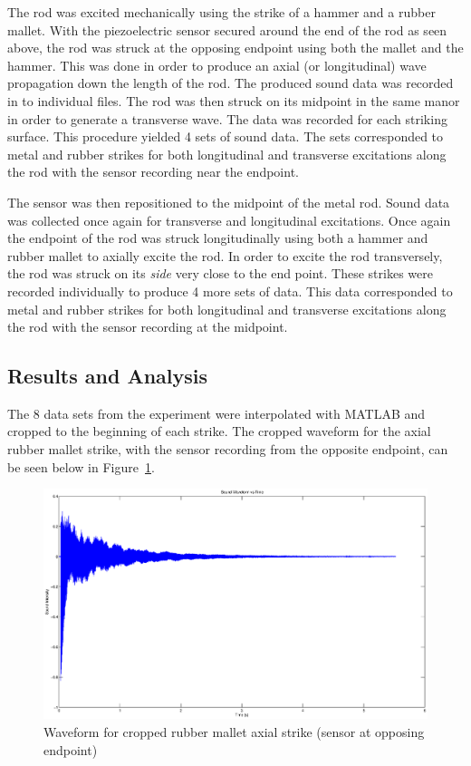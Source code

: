 The rod was excited mechanically using the strike of a hammer and a rubber mallet. With the piezoelectric sensor secured around the end of the rod as seen above, the rod was struck at the opposing endpoint using both the mallet and the hammer. This was done in order to produce an axial (or longitudinal) wave propagation down the length of the rod. The produced sound data was recorded in to individual files. The rod was then struck on its midpoint in the same manor in order to generate a transverse wave. The data was recorded for each striking surface. This procedure yielded 4 sets of sound data. The sets corresponded to metal and rubber strikes for both longitudinal and transverse excitations along the rod with the sensor recording near the endpoint. 

The sensor was then repositioned to the midpoint of the metal rod. Sound data was collected once again for transverse and longitudinal excitations. Once again the endpoint of the rod was struck longitudinally using both a hammer and rubber mallet to axially excite the rod. In order to excite the rod transversely, the rod was struck on its \emph{side} very close to the end point. These strikes were recorded individually to produce 4 more sets of data. This data corresponded to metal and rubber strikes for both longitudinal and transverse excitations along the rod with the sensor recording at the midpoint. 

\subsection{Results and Analysis}

The 8 data sets from the experiment were interpolated with MATLAB and cropped to the beginning of each strike. The cropped waveform for the axial rubber mallet strike, with the sensor recording from the opposite endpoint, can be seen below in Figure~\ref{fig:axial_endpoint}.

\begin{figure}[h]
	\centering
	\includegraphics[width=\textwidth]{../figures/axial_rubber_endpoint.eps}
	\caption{Waveform for cropped rubber mallet axial strike (sensor at opposing endpoint)}
	\label{fig:axial_endpoint}
\end{figure}
	
